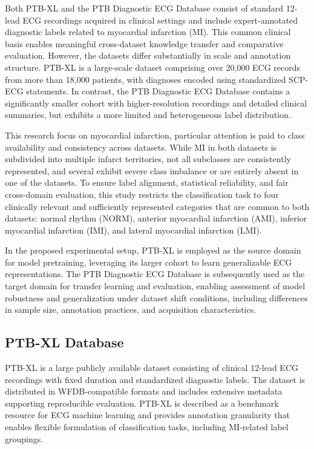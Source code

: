 \documentclass[preprint,12pt]{elsarticle}
\begin{document}
Both PTB-XL and the PTB Diagnostic ECG Database consist of standard 12-lead ECG recordings acquired in clinical settings and include expert-annotated diagnostic labels related to myocardial infarction (MI). This common clinical basis enables meaningful cross-dataset knowledge transfer and comparative evaluation. However, the datasets differ substantially in scale and annotation structure. PTB-XL is a large-scale dataset comprising over 20,000 ECG records from more than 18,000 patients, with diagnoses encoded using standardized SCP-ECG statements. In contrast, the PTB Diagnostic ECG Database contains a significantly smaller cohort with higher-resolution recordings and detailed clinical summaries, but exhibits a more limited and heterogeneous label distribution.

This research focus on myocardial infarction, particular attention is paid to class availability and consistency across datasets. While MI in both datasets is subdivided into multiple infarct territories, not all subclasses are consistently represented, and several exhibit severe class imbalance or are entirely absent in one of the datasets. To ensure label alignment, statistical reliability, and fair cross-domain evaluation, this study restricts the classification task to four clinically relevant and sufficiently represented categories that are common to both datasets: normal rhythm (NORM), anterior myocardial infarction (AMI), inferior myocardial infarction (IMI), and lateral myocardial infarction (LMI).

In the proposed experimental setup, PTB-XL is employed as the source domain for model pretraining, leveraging its larger cohort to learn generalizable ECG representations. The PTB Diagnostic ECG Database is subsequently used as the target domain for transfer learning and evaluation, enabling assessment of model robustness and generalization under dataset shift conditions, including differences in sample size, annotation practices, and acquisition characteristics.


\subsection{PTB-XL Database}
PTB-XL is a large publicly available dataset consisting of clinical 12-lead ECG recordings with fixed duration and standardized diagnostic labels. The dataset is distributed in WFDB-compatible formats and includes extensive metadata supporting reproducible evaluation. PTB-XL is described as a benchmark resource for ECG machine learning and provides annotation granularity that enables flexible formulation of classification tasks, including MI-related label groupings.
\end{document}
